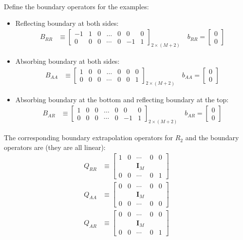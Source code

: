 \documentclass[11pt]{article}
\begin{document}
Define the boundary operators for the examples:
\begin{itemize}
\item Reflecting boundary at both sides:
\begin{align}
	B_{RR} &\equiv \begin{bmatrix}
	-1&1&0&\dots&0&0&0\\
	0&0&0&\cdots&0&-1&1
	\end{bmatrix}_{2\times (M+2)}\quad
	b_{RR} = \begin{bmatrix}0\\0\end{bmatrix}\label{eq:B-RR}
\end{align}
\item Absorbing boundary at both sides:
\begin{align}
	B_{AA} &\equiv \begin{bmatrix}
	1&0&0&\dots&0&0&0\\
	0&0&0&\cdots&0&0&1
	\end{bmatrix}_{2\times (M+2)}\quad
	b_{AA} = \begin{bmatrix}0\\0\end{bmatrix}\label{eq:B-AA}
\end{align}
\item Absorbing boundary at the bottom and reflecting boundary at the top:
\begin{align}
	B_{AR} &\equiv \begin{bmatrix}
	1&0&0&\dots&0&0&0\\
	0&0&0&\cdots&0&-1&1
	\end{bmatrix}_{2\times (M+2)}\quad
	b_{AR} = \begin{bmatrix}0\\0\end{bmatrix}\label{eq:B-AR}
\end{align}
\end{itemize}

The corresponding boundary extrapolation operators for $R_2$ and the boundary operators are (they are all linear):
\begin{align}
	Q_{RR} &\equiv \begin{bmatrix}1&0&\cdots&0&0\\&&\mathbf{I}_M&&\\0&0&\cdots&0&1\end{bmatrix}\label{eq:Q-RR}\\
	Q_{AA} &\equiv \begin{bmatrix}0&0&\cdots&0&0\\&&\mathbf{I}_M&&\\0&0&\cdots&0&0\end{bmatrix}\label{eq:Q-AA}\\
	Q_{AR} &\equiv \begin{bmatrix}0&0&\cdots&0&0\\&&\mathbf{I}_M&&\\0&0&\cdots&0&1\end{bmatrix}\label{eq:Q-AR}
\end{align}
\end{document}
